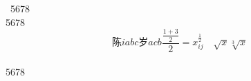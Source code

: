 \documentclass{article}
\begin{document}
\\
\\\\\\\\\\\\\\\\\\\\\\\\\\\\\\\\\\\\\
5678\\
5678\\
\[ 陈iabc岁acb\frac{\frac{1+3}{2}}{2}= x_{ij}^{\frac{1}{2}}\quad \sqrt{x} \sqrt[3]{x} \]\\
5678
\end{document}
